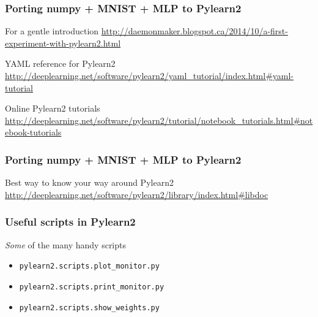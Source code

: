 \documentclass[mathserif, xcolor=dvipsnames]{beamer}
\begin{document}
\begin{frame}[fragile]
    \frametitle{Porting numpy + MNIST + MLP to Pylearn2}

    \begin{alertblock}{For a gentle introduction}
    \url{http://daemonmaker.blogspot.ca/2014/10/a-first-experiment-with-pylearn2.html}
    \end{alertblock}

    \begin{alertblock}{YAML reference for Pylearn2}
    \url{http://deeplearning.net/software/pylearn2/yaml_tutorial/index.html#yaml-tutorial}
    \end{alertblock}

    \begin{alertblock}{Online Pylearn2 tutorials}
    \url{http://deeplearning.net/software/pylearn2/tutorial/notebook_tutorials.html#notebook-tutorials}
    \end{alertblock}
\end{frame}

\begin{frame}[fragile]
    \frametitle{Porting numpy + MNIST + MLP to Pylearn2}

    \begin{alertblock}{Best way to know your way around Pylearn2}
    \url{http://deeplearning.net/software/pylearn2/library/index.html#libdoc}
    \end{alertblock}
\end{frame}

\begin{frame}[fragile]
    \frametitle{Useful scripts in Pylearn2}

    \begin{block}{\emph{Some} of the many handy scripts}
    \begin{itemize}
        \item{\texttt{pylearn2.scripts.plot\_monitor.py}}
        \item{\texttt{pylearn2.scripts.print\_monitor.py}}
        \item{\texttt{pylearn2.scripts.show\_weights.py}}
    \end{itemize}
    \end{block}
\end{frame}
\end{document}
